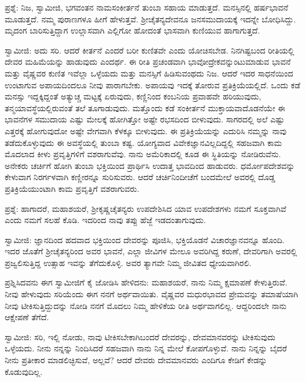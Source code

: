 ಪ್ರಶ್ನೆ: ನಿಜ, ಸ್ವಾಮೀಜಿ, ಭಗವಂತನ ನಾಮಸಂಕೀರ್ತನೆ ತುಂಬಾ ಸಹಾಯ ಮಾಡುತ್ತದೆ. ಮನಸ್ಸಿನಲ್ಲಿ ಹರ್ಷಭಾವನೆ ಮೂಡುತ್ತದೆ. ನಮ್ಮ ಪುರಾಣಗಳೂ ಹೀಗೆ ಹೇಳುತ್ತವೆ. ಶ‍್ರೀಚೈತನ್ಯದೇವನೂ ಜನಸಮುದಾಯಕ್ಕೆ ಇದನ್ನೇ ಬೋಧಿಸಿದ್ದು. ಮೃದಂಗ ಬಾರಿಸುತ್ತಿದ್ದಾಗ ಉಲ್ಲಾಸವಾಗಿ ಎಲ್ಲಿಗೋ ಹೋದಂತೆ ಭಾಸವಾಗಿ ಕುಣಿಯುವ ಹಾಗಾಗುತ್ತದೆ.

ಸ್ವಾಮೀಜಿ: ಅದು ಸರಿ. ಆದರೆ ಕೀರ್ತನೆ ಎಂದರೆ ಬರೀ ಕುಣಿತವೇ ಎಂದು ಯೋಚಿಸಬೇಡ. ನಿನಗಿಷ್ಟಬಂದ ರೀತಿಯಲ್ಲಿ ದೇವರ ಮಹಿಮೆಯನ್ನು ಹಾಡುವುದು ಎಂದರ್ಥ. ಈ ರೀತಿ ಪ್ರಚಂಡವಾಗಿ ಭಾವೋದ್ರೇಕವನ್ನುಂಟುಮಾಡುವ ಭಾವನೆ ಮತ್ತು ವೈಷ್ಣವರ ಕುಣಿತ ಇವೆಲ್ಲಾ ಒಳ್ಳೆಯದು ಮತ್ತು ಮನಸ್ಸಿಗೆ ಹಿಡಿಸುವಂಥದು ನಿಜ. ಆದರೆ ಇದರ ಸಾಧನೆಯಿಂದ ಉಂಟಾಗುವ ಅಪಾಯದಿಂದಲೂ ನೀವು ಪಾರಾಗಬೇಕು. ಅಪಾಯವು ಇದಕ್ಕೆ ತೋರುವ ಪ್ರತಿಕ್ರಿಯೆಯಲ್ಲಿದೆ. ಒಂದು ಕಡೆ ಮನಸ್ಸು ಇದ್ದಕ್ಕಿದ್ದಂತೆ ಅತ್ಯುಚ್ಚ ಮಟ್ಟಕ್ಕೆ ಏರುವುದು, ಕಣ್ಣಿನಿಂದ ಕಂಬನಿಯ ಪ್ರವಾಹವೇ ಹರಿಯುವುದು, ತನ್ಮಯಾವಸ್ಥೆಯಲ್ಲಿರುವಂತೆ ತಲೆ ತೂಗಾಡುವುದು. ಮತ್ತೊಂದು ಕಡೆ ಸಂಕೀರ್ತನೆ ಮುಕ್ತಾಯವಾದೊಡನೆಯೇ ಈ ಭಾವನೆಗಳ ಸಮುದಾಯ ಎಷ್ಟು ಮೇಲಕ್ಕೆ ಹೋಗಿತ್ತೋ ಅಷ್ಟೇ ರಭಸದಿಂದ ಬೀಳುವುದು. ಸಾಗರದಲ್ಲಿ ಅಲೆ ಎಷ್ಟು ಎತ್ತರಕ್ಕೆ ಹೋಗುವುದೋ ಅಷ್ಟೇ ವೇಗವಾಗಿ ಕೆಳಕ್ಕೂ ಬೀಳುವುದು. ಈ ಪ್ರತಿಕ್ರಿಯೆಯನ್ನು ಎದುರಿಸಿ ನಮ್ಮನ್ನು ನಾವು ತಡೆದುಕೊಳ್ಳುವುದು ಈ ಅವಸ್ಥೆಯಲ್ಲಿ ತುಂಬಾ ಕಷ್ಟ. ಯೋಗ್ಯವಾದ ವಿವೇಕಜ್ಞಾನವಿಲ್ಲದಿದ್ದಲ್ಲಿ ಸಹಜವಾಗಿ ಕಾಮ ಮೊದಲಾದ ಕೀಳು ಪ್ರವೃತ್ತಿಗಳಿಗೆ ವಶರಾಗುವೆವು. ನಾನು ಅಮೆರಿಕಾದಲ್ಲಿ ಕೂಡ ಈ ಸ್ಥಿತಿಯನ್ನು ನೋಡಿರುವೆನು. ಅನೇಕರು ಚರ್ಚಿಗೆ ಹೋಗಿ ತುಂಬಾ ಭಕ್ತಿಯಿಂದ ಪ್ರಾರ್ಥಿಸಿ ಉದಾತ್ತ ಭಾವದಿಂದ ಹಾಡುವರು. ಧರ್ಮೋಪದೇಶವನ್ನು ಕೇಳುವಾಗ ನಿರರ್ಗಳವಾಗಿ ಕಣ್ಣೀರನ್ನೂ ಸುರಿಸುವರು. ಆದರೆ ಚರ್ಚಿನಿಂದೀಚೆಗೆ ಬಂದಮೇಲೆ ಅವರಲ್ಲಿ ದೊಡ್ಡ ಪ್ರತಿಕ್ರಿಯೆಯುಂಟಾಗಿ ಕಾಮ ಪ್ರವೃತ್ತಿಗೆ ವಶರಾಗುವರು.

ಪ್ರಶ್ನೆ: ಹಾಗಾದರೆ, ಮಹಾಶಯರೆ, ಶ‍್ರೀಕೃಷ್ಣಚೈತನ್ಯರು ಉಪದೇಶಿಸಿದ ಯಾವ ಉಪದೇಶಗಳು ನಮಗೆ ಸೂಕ್ತವಾಗಿವೆ ಎಂದು ನಮಗೆ ಸಲಹೆ ಕೊಡಿ. ಇದರಿಂದ ನಾವು ತಪ್ಪು ಹೆಜ್ಜೆ ಇಡದಂತಾಗುವುದು.

ಸ್ವಾಮೀಜಿ: ಜ್ಞಾನದಿಂದ ಹದವಾದ ಭಕ್ತಿಯಿಂದ ದೇವರನ್ನು ಪೂಜಿಸಿ, ಭಕ್ತಿಯೊಡನೆ ವಿಚಾರಜ್ಞಾನವನ್ನೂ ಹೊಂದಿ. ಇದರ ಜೊತೆಗೆ ಶ‍್ರೀಚೈತನ್ಯರಿಂದ ಅವರ ಭಾವನೆ, ಎಲ್ಲಾ ಜೀವಿಗಳ ಮೇಲೂ ಅವರಿಗಿದ್ದ ಕರುಣೆ, ದೇವರಿಗಾಗಿ ಅವರಲ್ಲಿ ಪ್ರಜ್ವಲಿಸುತ್ತಿದ್ದ ಉತ್ಸಾಹ ಇವನ್ನು ತೆಗೆದುಕೊಳ್ಳಿ. ಅವರ ತ್ಯಾಗವೇ ನಿಮ್ಮ ಜೀವಿತದ ಧ್ಯೇಯವಾಗಿರಲಿ.

ಪ್ರಶ್ನಿಸಿದವನು ಈಗ ಸ್ವಾಮೀಜಿಗೆ ಕೈ ಜೋಡಿಸಿ ಹೇಳಿದನು: ಮಹಾಶಯರೆ, ನಾನು ನಿಮ್ಮ ಕ್ಷಮಾಪಣೆ ಕೇಳುತ್ತಿರುವೆ. ನೀವು ಹೇಳುವುದು ಸರಿಯೆಂದು ಈಗ ನನಗೆ ಅರ್ಥವಾಯಿತು. ವೈಷ್ಣವರ ಮಧುರಭಾವದ ಪ್ರೇಮವನ್ನು ತಮಾಷೆಯಾಗಿ ನೀವು ಟೀಕಿಸುತ್ತಿದ್ದುದನ್ನು ನೋಡಿ ನನಗೆ ಮೊದಲು ನಿಮ್ಮ ಹೇಳಿಕೆಯ ರೀತಿ ಅರ್ಥವಾಗಲಿಲ್ಲ. ಆದ್ದರಿಂದಲೇ ನಾನು ಆಕ್ಷೇಪಣೆ ತೆಗೆದೆ.

ಸ್ವಾಮೀಜಿ: ಸರಿ, ಇಲ್ಲಿ ನೋಡು, ನಾವು ಟೀಕಿಸಬೇಕಾಗಿಬಂದರೆ ದೇವರನ್ನು, ದೇವಮಾನವರನ್ನು ಟೀಕಿಸುವುದು ಒಳ್ಳೆಯದು. ನೀನು ನನ್ನನ್ನು ನಿಂದಿಸಿದರೆ ಸಹಜವಾಗಿ ನಾನು ನಿನ್ನ ಮೇಲೆ ಕೋಪಗೊಳ್ಳುವೆ. ನಾನು ನಿನ್ನನ್ನು ಬೈದರೆ ನೀನು ಪ್ರತೀಕಾರ ಮಾಡಲಿಚ್ಛಿಸುವೆ, ಅಲ್ಲವೆ? ಆದರೆ ದೇವರು ದೇವಮಾನವರು ಎಂದಿಗೂ ಕೇಡಿಗೆ ಕೇಡನ್ನು ಕೊಡುವುದಿಲ್ಲ.

